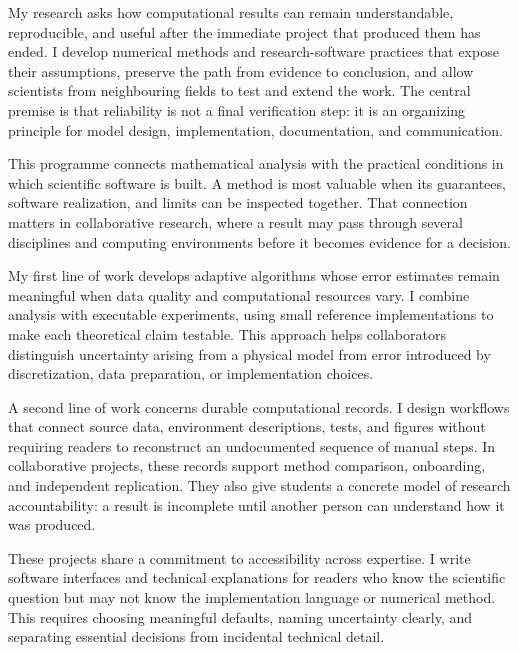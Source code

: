 \documentclass[type=research]{careerdossier-statement}
\begin{document}
\MakeCDossierStatementHeader


My research asks how computational results can remain understandable,
reproducible, and useful after the immediate project that produced them has
ended. I develop numerical methods and research-software practices that expose
their assumptions, preserve the path from evidence to conclusion, and allow
scientists from neighbouring fields to test and extend the work. The central
premise is that reliability is not a final verification step: it is an
organizing principle for model design, implementation, documentation, and
communication.

This programme connects mathematical analysis with the practical conditions in
which scientific software is built. A method is most valuable when its
guarantees, software realization, and limits can be inspected together. That
connection matters in collaborative research, where a result may pass through
several disciplines and computing environments before it becomes evidence for a
decision.


My first line of work develops adaptive algorithms whose error estimates remain
meaningful when data quality and computational resources vary. I combine
analysis with executable experiments, using small reference implementations to
make each theoretical claim testable. This approach helps collaborators
distinguish uncertainty arising from a physical model from error introduced by
discretization, data preparation, or implementation choices.

A second line of work concerns durable computational records. I design workflows
that connect source data, environment descriptions, tests, and figures without
requiring readers to reconstruct an undocumented sequence of manual steps. In
collaborative projects, these records support method comparison, onboarding, and
independent replication. They also give students a concrete model of research
accountability: a result is incomplete until another person can understand how
it was produced.

These projects share a commitment to accessibility across expertise. I write
software interfaces and technical explanations for readers who know the
scientific question but may not know the implementation language or numerical
method. This requires choosing meaningful defaults, naming uncertainty clearly,
and separating essential decisions from incidental technical detail.
\end{document}

